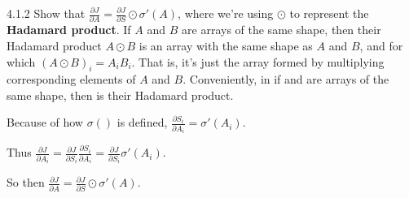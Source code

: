 \documentclass[12pt,letterpaper]{article}
\begin{document}
\begin{problem}{4.1.2}
    Show that $\frac{\partial J}{\partial A}=\frac{\partial J}{\partial S}\odot\sigma'(A)$,
    where we're using $\odot$ to represent the \textbf{Hadamard product}.
    If $A$ and $B$ are arrays of the same shape, then their Hadamard
    product $A\odot B$ is an array with the same shape as $A$ and $B$,
    and for which $\left(A\odot B\right)_{i}=A_{i}B_{i}$. That is, it's
    just the array formed by multiplying corresponding elements of $A$
    and $B$. Conveniently, in  if  and 
    are arrays of the same shape, then  is their Hadamard
    product.
\end{problem}
\begin{solution}{}
    Because of how $\sigma ()$ is defined, $\frac{\partial S_i}{\partial A_i} = \sigma '(A_i)$.
    
    Thus $\frac{\partial J}{\partial A_i} = \frac{\partial J}{\partial S_i}\frac{\partial S_i}{\partial A_i} = \frac{\partial J}{\partial S_i}\sigma '(A_i)$.
    
    So then $\frac{\partial J}{\partial A}=\frac{\partial J}{\partial S}\odot \sigma '(A)$.
\end{solution}
\end{document}

